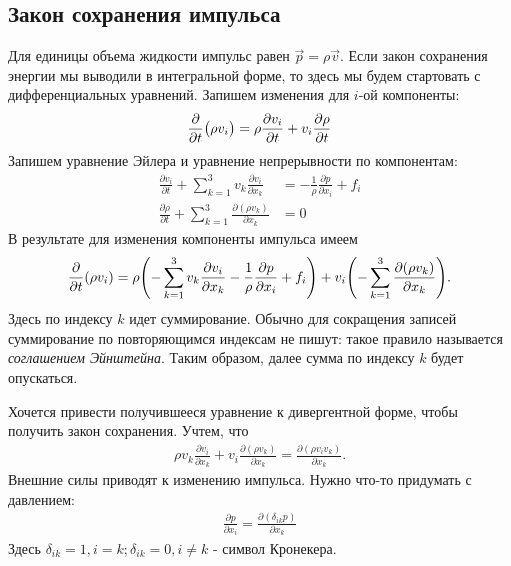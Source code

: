 \subsection{Закон сохранения импульса}
Для единицы объема жидкости импульс равен $ \vec { p } = \rho \vec{v} $. Если закон сохранения энергии мы выводили в интегральной форме, то здесь мы будем стартовать с дифференциальных уравнений. Запишем изменения для $i$-ой компоненты:
\begin{align*}
\pdv{t} \big( \rho v _ { i } \big) = \rho \frac { \partial v _ { i } } { \partial t } + v _ { i } \frac { \partial \rho } { \partial t }
\end{align*}
Запишем уравнение Эйлера и уравнение непрерывности по компонентам:
\begin{align*}
\frac { \partial v _ { i } } { \partial t } + \sum _ { k = 1 } ^ { 3 } v _ { k } \frac { \partial v _ { i } } { \partial x_k } &= - \frac { 1 } { \rho } \frac { \partial p } { \partial x _ { i } } + f _ { i } \\
\frac { \partial \rho } { \partial t } + \sum _ { k = 1 } ^ { 3 } \frac { \partial \left( \rho v _ { k } \right) } { \partial x _ { k } } &= 0
\end{align*}
В результате для изменения компоненты импульса имеем
\begin{equation}
	\pdv{t}\qty(\rho v_i)=
	\rho\qty(-\sum\limits_{k=1}^3 v_k\pdv{v_i}{x_k}-\frac{1}{\rho} \pdv{p}{x_i} + f_i)+
	v_i\qty(-\sum\limits_{k=1}^3 \pdv{(\rho v_k)}{x_k}).
\end{equation}
Здесь по индексу $k$ идет суммирование. Обычно для сокращения записей суммирование по повторяющимся индексам не пишут: такое правило называется \textit{соглашением Эйнштейна}. Таким образом, далее сумма по индексу $k$ будет опускаться. 

Хочется привести получившееся уравнение к дивергентной форме, чтобы получить закон сохранения. Учтем, что
\begin{align*}
\rho v _ { k } \frac { \partial v _ { i } } { \partial x _ { k } } + v _ { i } \frac { \partial \left( \rho v _ { k } \right) } { \partial x _ { k } } = \frac { \partial \left( \rho v _ { i } v _ { k } \right) } { \partial x _ { k } }.
\end{align*}
Внешние силы приводят к изменению импульса. Нужно что-то придумать с давлением:
\begin{align*}
\frac { \partial p } { \partial x _ { i } } = \frac { \partial \left( \delta _ { i k } p \right) } { \partial x _ { k } }
\end{align*}
Здесь $ \delta _ { i k } = 1 , i = k ; \delta _ { i k } = 0 , i \neq k $ - символ Кронекера.

